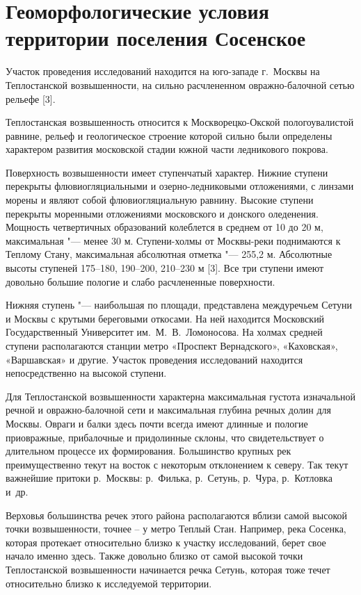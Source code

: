 \chapter{Геоморфологические условия территории поселения Сосенское}\label{ch:ch3}

Участок проведения исследований находится на юго-западе г.~Москвы на Теплостанской возвышенности, на сильно расчлененном овражно-балочной сетью рельефе [3]. 

Теплостанская возвышенность относится к Москворецко-Окской пологоувалистой равнине, рельеф 
и геологическое строение которой сильно были определены характером развития московской стадии южной части ледникового покрова. 

Поверхность возвышенности имеет ступенчатый характер. Нижние ступени перекрыты флювиогляциальными 
и озерно-ледниковыми отложениями, с линзами морены и являют собой флювиогляциальную равнину. 
Высокие ступени перекрыты моренными отложениями московского и донского оледенения. 
Мощность четвертичных образований колеблется в среднем от 10 до 20 м, максимальная "--- менее 30 м. 
Ступени-холмы от Москвы-реки поднимаются к Теплому Стану, максимальная абсолютная отметка "--- 255,2 м. 
Абсолютные высоты ступеней 175--180, 190--200, 210--230 м [3]. 
Все три ступени имеют довольно большие пологие 
и слабо расчлененные поверхности. 

Нижняя ступень "--- наибольшая по площади, представлена междуречьем Сетуни 
и Москвы с крутыми береговыми откосами. На ней находится Московский Государственный Университет им.~М.~В.~Ломоносова. 
На холмах средней ступени располагаются станции метро «Проспект Вернадского», «Каховская», «Варшавская» и другие. 
Участок проведения исследований находится непосредственно на высокой ступени. 

Для Теплостанской возвышенности характерна максимальная густота изначальной речной 
и овражно-балочной сети и максимальная глубина речных долин для Москвы. 
Овраги и балки здесь почти всегда имеют длинные и пологие приовражные, прибалочные и придолинные склоны, 
что свидетельствует о длительном процессе их формирования. Большинство крупных рек преимущественно текут 
на восток с некоторым отклонением к северу. Так текут важнейшие притоки р.~Москвы: 
р.~Филька, р.~Сетунь, р.~Чура, р.~Котловка и~др. 

Верховья большинства речек этого района располагаются вблизи самой высокой точки возвышенности, 
точнее – у метро Теплый Стан. Например, река Сосенка, которая протекает относительно близко к участку исследований, 
берет свое начало именно здесь. Также довольно близко от самой высокой точки 
Теплостанской возвышенности начинается речка Сетунь, которая тоже течет относительно близко к исследуемой территории.